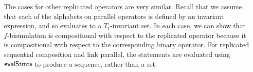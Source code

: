 

The cases for other replicated operators are very similar.  Recall that we
assume that each of the alphabets on parallel operators is defined by an
invariant expression, and so evaluates to a $T_1$-invariant set.  In each
case, we can show that $f$-bisimulation is compositional with respect to the
replicated operator because it is compositional with respect to the
corresponding binary operator.  For replicated sequential composition and link
parallel, the statements are evaluated using $\mathop{\sf evalStmts}$ to produce a
sequence, rather than a set.


